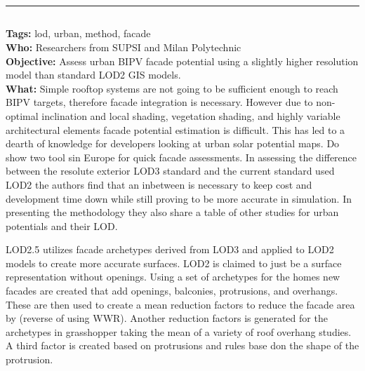 \documentclass[11pt,a4paper]{article}
\makeatletter
\renewcommand{\maketitle}{\bgroup
   \begin{center}
   \textbf{{\fontsize{18pt}{20}\selectfont \@title}}\\
   \vspace{10pt}
   {\fontsize{12pt}{0}\selectfont \@author} 
   \end{center}
}
\makeatother
\begin{document}

\thispagestyle{fancy}


\noindent\rule{\textwidth}{1pt}
\subsection*{}
\textbf{Tags:} lod, urban, method, facade \\
\textbf{Who:} Researchers from SUPSI and Milan Polytechnic \\
\textbf{Objective:} Assess urban BIPV facade potential using a slightly higher resolution model than standard LOD2 GIS models. \\
\textbf{What:} Simple rooftop systems are not going to be sufficient enough to reach BIPV targets, therefore facade integration is necessary. However due to non-optimal inclination and local shading, vegetation shading, and highly variable architectural elements facade potential estimation is difficult. This has led to a dearth of knowledge for developers looking at urban solar potential maps. Do show two tool sin Europe for quick facade assessments. In assessing the difference between the resolute exterior LOD3 standard and the current standard used LOD2 the authors find that an inbetween is necessary to keep cost and development time down while still proving to be more accurate in simulation. In presenting the methodology they also share a table of other studies for urban potentials and their LOD. 

LOD2.5 utilizes facade archetypes derived from LOD3 and applied to LOD2 models to create more accurate surfaces. LOD2 is claimed to just be a surface representation without openings. Using a set of archetypes for the homes new facades are created that add openings, balconies, protrusions, and overhangs. These are then used to create a mean reduction factors to reduce the facade area by (reverse of using WWR). Another reduction factors is generated for the archetypes in grasshopper taking the mean of a variety of roof overhang studies. A third factor is created based on protrusions and rules base don the shape of the protrusion.  
\end{document}
